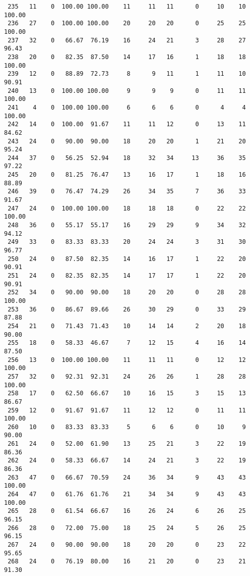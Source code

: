 \begin{verbatim}
 235   11    0  100.00 100.00    11     11   11      0     10    10   100.00
 236   27    0  100.00 100.00    20     20   20      0     25    25   100.00
 237   32    0   66.67  76.19    16     24   21      3     28    27    96.43
 238   20    0   82.35  87.50    14     17   16      1     18    18   100.00
 239   12    0   88.89  72.73     8      9   11      1     11    10    90.91
 240   13    0  100.00 100.00     9      9    9      0     11    11   100.00
 241    4    0  100.00 100.00     6      6    6      0      4     4   100.00
 242   14    0  100.00  91.67    11     11   12      0     13    11    84.62
 243   24    0   90.00  90.00    18     20   20      1     21    20    95.24
 244   37    0   56.25  52.94    18     32   34     13     36    35    97.22
 245   20    0   81.25  76.47    13     16   17      1     18    16    88.89
 246   39    0   76.47  74.29    26     34   35      7     36    33    91.67
 247   24    0  100.00 100.00    18     18   18      0     22    22   100.00
 248   36    0   55.17  55.17    16     29   29      9     34    32    94.12
 249   33    0   83.33  83.33    20     24   24      3     31    30    96.77
 250   24    0   87.50  82.35    14     16   17      1     22    20    90.91
 251   24    0   82.35  82.35    14     17   17      1     22    20    90.91
 252   34    0   90.00  90.00    18     20   20      0     28    28   100.00
 253   36    0   86.67  89.66    26     30   29      0     33    29    87.88
 254   21    0   71.43  71.43    10     14   14      2     20    18    90.00
 255   18    0   58.33  46.67     7     12   15      4     16    14    87.50
 256   13    0  100.00 100.00    11     11   11      0     12    12   100.00
 257   32    0   92.31  92.31    24     26   26      1     28    28   100.00
 258   17    0   62.50  66.67    10     16   15      3     15    13    86.67
 259   12    0   91.67  91.67    11     12   12      0     11    11   100.00
 260   10    0   83.33  83.33     5      6    6      0     10     9    90.00
 261   24    0   52.00  61.90    13     25   21      3     22    19    86.36
 262   24    0   58.33  66.67    14     24   21      3     22    19    86.36
 263   47    0   66.67  70.59    24     36   34      9     43    43   100.00
 264   47    0   61.76  61.76    21     34   34      9     43    43   100.00
 265   28    0   61.54  66.67    16     26   24      6     26    25    96.15
 266   28    0   72.00  75.00    18     25   24      5     26    25    96.15
 267   24    0   90.00  90.00    18     20   20      0     23    22    95.65
 268   24    0   76.19  80.00    16     21   20      0     23    21    91.30

\end{verbatim}
